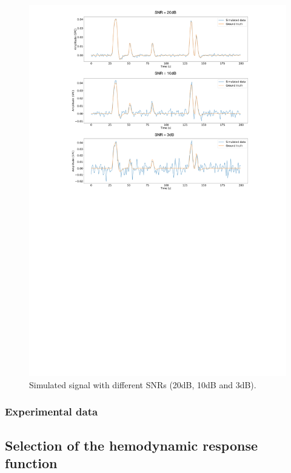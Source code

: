 \begin{figure}[h]
    \begin{center}
        \includegraphics[width=\columnwidth]{figures/sim.pdf}
    \end{center}
    \caption{Simulated signal with different SNRs (20dB, 10dB and 3dB).}
\label{fig:simulations}
\end{figure}

\subsubsection{Experimental data}

\subsection{Selection of the hemodynamic response function}

